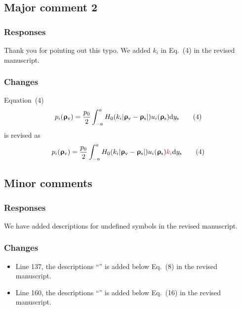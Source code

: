 \documentclass[12pt]{article}
\begin{document}
\subsection{Major comment 2}
\begin{commentbox}
    \lipsum[4]
\end{commentbox}

\subsubsection*{Responses}
Thank you for pointing out this typo.
We added $k_i$ in Eq.~(4) in the revised manuscript.

\subsubsection*{Changes}
Equation~(4)
\begin{equation}
    p_i(\bm\uprho_\mathrm{v}) =
    \frac{p_0}{2}
    \int_{-a}^a H_0(k_i\abs{\bm\uprho_\mathrm{v}-\bm\uprho_\mathrm{s}})
    u_i(\bm\uprho_\mathrm{s})
    \dd y_\mathrm{s}
    \tag{4}
\end{equation}
is revised as
\begin{equation}
    p_i(\bm\uprho_\mathrm{v}) =
    \frac{p_0}{2}
    \int_{-a}^a H_0(k_i\abs{\bm\uprho_\mathrm{v}-\bm\uprho_\mathrm{s}})
    u_i(\bm\uprho_\mathrm{s})
    \rev{k_i}
    \dd y_\mathrm{s}
    \tag{4}
\end{equation}


\subsection{Minor comments}
\begin{commentbox}
    \lipsum[5]
\end{commentbox}

\subsubsection*{Responses}
We have added descriptions for undefined symbols in the revised manuscript.

\subsubsection*{Changes}
\begin{itemize}
    \item
          Line 137, the descriptions
          ``''
          is added below Eq.~(8) in the revised manuscript.

    \item
          Line 160, the descriptions
          ``''
          is added below Eq.~(16) in the revised manuscript.
\end{itemize}
\end{document}
